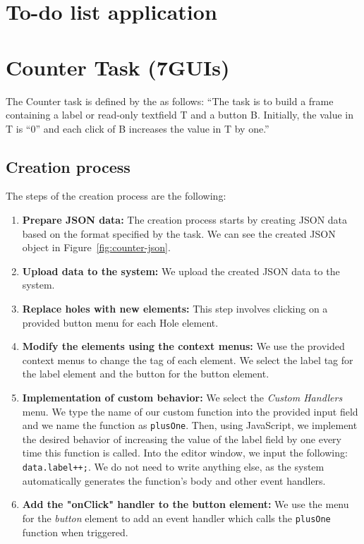 \section{To-do list application}

\section{Counter Task (7GUIs)}
The Counter task is defined by the \citet{7GUIs-web} as follows: ``The task is to build a frame containing a label or read-only textfield T and a button B. Initially, the value in T is “0” and each click of B increases the value in T by one.''

\subsection {Creation process}

The steps of the creation process are the following:
\begin{enumerate}
	\item \textbf{Prepare JSON data:} The creation process starts by creating JSON data based on the format specified by the task.
	      We can see the created JSON object in Figure~\ref{fig:counter-json}.
	\item \textbf{Upload data to the system:} We upload the created JSON data to the system.
	\item \textbf{Replace holes with new elements:} This step involves clicking on a provided button menu for each Hole element.
	\item \textbf{Modify the elements using the context menus:} We use the provided context menus to change the tag of each element.
	      We select the label tag for the label element and the button for the button element.
	\item \textbf{Implementation of custom behavior:} We select the \emph{Custom Handlers} menu.
	      We type the name of our custom function into the provided input field and
	      we name the function as \texttt{plusOne}.
	      Then, using JavaScript, we implement the desired behavior of increasing the value of the label field by one
	      every time this function is called.
	      Into the editor window, we input the following: \texttt{data.label++;}.
	      We do not need to write anything else, as the system automatically generates the function's body and other event handlers.
	\item \textbf{Add the "onClick" handler to the button element:} We use the menu for the \emph{button} element to add an event handler
	      which calls the \texttt{plusOne} function when triggered.
\end{enumerate}


